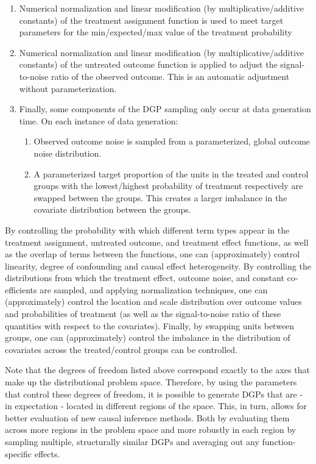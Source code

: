 \documentclass[../main.tex]{subfiles}
\begin{document}
\begin{enumerate}
    \item Numerical normalization and linear modification (by multiplicative/additive constants) of the treatment assignment function is used to meet target parameters for the min/expected/max value of the treatment probability
    
    \item Numerical normalization and linear modification (by multiplicative/additive constants) of the untreated outcome function is applied to adjust the signal-to-noise ratio of the observed outcome. This is an automatic adjustment without parameterization.
    
    \item Finally, some components of the DGP sampling only occur at data generation time. On each instance of data generation:

    \begin{enumerate}
        \item Observed outcome noise is sampled from a parameterized, global outcome noise distribution.
        \item A parameterized target proportion of the units in the treated and control groups with the lowest/highest probability of treatment respectively are swapped between the groups. This creates a larger imbalance in the covariate distribution between the groups.
    \end{enumerate}
    
\end{enumerate}

By controlling the probability with which different term types appear in the treatment assignment, untreated outcome, and treatment effect functions, as well as the overlap of terms between the functions, one can (approximately) control linearity, degree of confounding and causal effect heterogeneity. By controlling the distributions from which the treatment effect, outcome noise, and constant co-efficients are sampled, and applying normalization techniques, one can (approximately) control the location and scale distribution over outcome values and probabilities of treatment (as well as the signal-to-noise ratio of these quantities with respect to the covariates). Finally, by swapping units between groups, one can (approximately) control the imbalance in the distribution of covariates across the treated/control groups can be controlled.

\vspace{\baselineskip}

Note that the degrees of freedom listed above correspond exactly to the axes that make up the distributional problem space. Therefore, by using the parameters that control these degrees of freedom, it is possible to generate DGPs that are - in expectation - located in different regions of the space. This, in turn, allows for better evaluation of new causal inference methods. Both by evaluating them across more regions in the problem space and more robustly in each region by sampling multiple, structurally similar DGPs and averaging out any function-specific effects.
\end{document}
